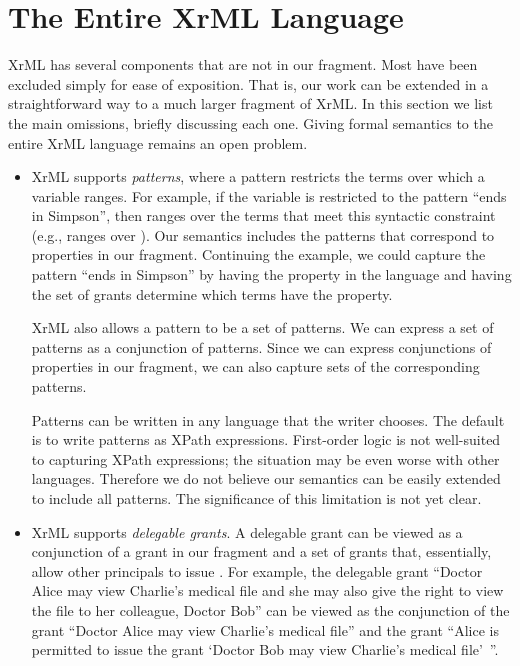 \documentclass{acmtrans2m}
\newcommand{\<}{
}
\renewcommand{\>}{\rangle}
\begin{document}
\section{The Entire XrML Language}\label{s:core}
XrML has several components that are not in our fragment.  Most have been excluded simply for ease of
exposition.
That is, our work can be extended in a straightforward way to a
much larger fragment of XrML.
In this section we list the main omissions, briefly discussing each one.
Giving formal semantics to the entire XrML language remains an open problem.

\begin{itemize}
\item XrML supports \emph{patterns}, where a pattern restricts the terms over which a variable
ranges. For example, if the variable  is restricted to the pattern ``ends in Simpson'', then
 ranges over the terms that meet this syntactic constraint (e.g.,  ranges over
).
Our semantics includes the patterns that correspond to properties in our fragment.
Continuing the example, we could capture the pattern ``ends in Simpson''
by having the property   in the
language and having the set of grants determine which terms have the property.



XrML
also
allows a pattern to be a set of patterns.  We can express a set of patterns as a
conjunction of patterns.  Since we can express conjunctions of
properties in our fragment, we can
also capture sets
of the corresponding patterns.

Patterns can be written in any language that the writer chooses.  The default is to
write patterns as XPath expressions.  First-order logic is not
well-suited to capturing
XPath expressions; the situation may be even worse with other languages.
Therefore we do not believe our semantics can be easily extended to
include all patterns.
The significance of this limitation is not yet clear.

\item XrML supports \emph{delegable grants}.  A delegable grant  can be viewed as a conjunction of a
grant  in our fragment and a set  of grants that, essentially, allow other principals to issue .
For example, the delegable grant ``Doctor Alice may view Charlie's medical file and she may also give the
right to view the file
to her colleague, Doctor Bob'' can be viewed as the conjunction of the grant
``Doctor Alice may view Charlie's medical file'' and the grant ``Alice is permitted to issue the grant
`Doctor Bob may view Charlie's medical file'\, ''.


\end{itemize}
\end{document}
